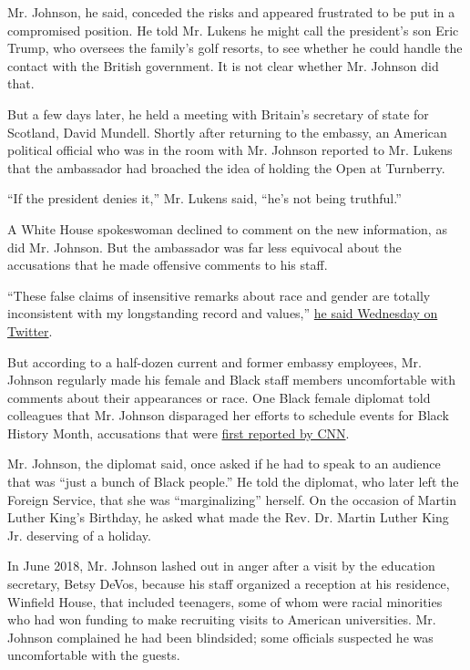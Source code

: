 Mr. Johnson, he said, conceded the risks and appeared frustrated to be
put in a compromised position. He told Mr. Lukens he might call the
president's son Eric Trump, who oversees the family's golf resorts, to
see whether he could handle the contact with the British government. It
is not clear whether Mr. Johnson did that.

But a few days later, he held a meeting with Britain's secretary of
state for Scotland, David Mundell. Shortly after returning to the
embassy, an American political official who was in the room with Mr.
Johnson reported to Mr. Lukens that the ambassador had broached the idea
of holding the Open at Turnberry.

``If the president denies it,'' Mr. Lukens said, ``he's not being
truthful.''

A White House spokeswoman declined to comment on the new information, as
did Mr. Johnson. But the ambassador was far less equivocal about the
accusations that he made offensive comments to his staff.

``These false claims of insensitive remarks about race and gender are
totally inconsistent with my longstanding record and values,''
\href{https://twitter.com/USAmbUK/status/1286029006500966402?s=20}{he
said Wednesday on Twitter}.

But according to a half-dozen current and former embassy employees, Mr.
Johnson regularly made his female and Black staff members uncomfortable
with comments about their appearances or race. One Black female diplomat
told colleagues that Mr. Johnson disparaged her efforts to schedule
events for Black History Month, accusations that were
\href{https://www.cnn.com/2020/07/22/politics/woody-johnson-oig-report/index.html}{first
reported by CNN}.

Mr. Johnson, the diplomat said, once asked if he had to speak to an
audience that was ``just a bunch of Black people.'' He told the
diplomat, who later left the Foreign Service, that she was
``marginalizing'' herself. On the occasion of Martin Luther King's
Birthday, he asked what made the Rev. Dr. Martin Luther King Jr.
deserving of a holiday.

In June 2018, Mr. Johnson lashed out in anger after a visit by the
education secretary, Betsy DeVos, because his staff organized a
reception at his residence, Winfield House, that included teenagers,
some of whom were racial minorities who had won funding to make
recruiting visits to American universities. Mr. Johnson complained he
had been blindsided; some officials suspected he was uncomfortable with
the guests.


